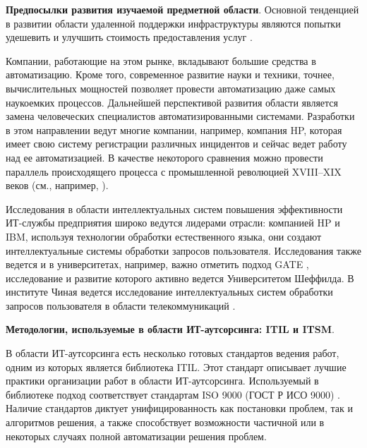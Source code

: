 \textbf{Предпосылки развития изучаемой предметной области}. 
Основной тенденцией в развитии области удаленной поддержки инфраструктуры являются попытки удешевить и улучшить стоимость предоставления услуг \cite{OutsourceEff}. \par
Компании, работающие на этом рынке, вкладывают большие средства в автоматизацию. Кроме того, современное развитие науки и техники, точнее, вычислительных мощностей \cite{SuperComputer} позволяет провести автоматизацию даже самых наукоемких процессов. Дальнейшей перспективой развития области является замена человеческих специалистов автоматизированными системами. Разработки в этом направлении ведут многие компании, например, компания HP, которая имеет свою систему регистрации различных инцидентов и сейчас ведет работу над ее автоматизацией. В качестве некоторого сравнения можно провести параллель происходящего процесса с промышленной революцией XVIII–XIX веков (см., например, \cite{IndustrialRev}). \par
Исследования в области интеллектуальных систем повышения эффективности ИТ-службы предприятия широко ведутся лидерами отрасли: компанией HP и IBM, используя технологии обработки естественного языка, они создают интеллектуальные системы обработки запросов пользователя. Исследования также ведется и в университетах, например, важно отметить подход GATE \cite{GATE-1}, исследование и развитие которого активно ведется Университетом Шеффилда. В институте Чиная ведется исследование интеллектуальных систем обработки запросов пользователя в области телекоммуникаций \cite{CHIN-1}.  \par

\textbf{Методологии, используемые в области ИТ-аутсорсинга: ITIL и ITSM}. \par
В области ИТ-аутсорсинга есть несколько готовых стандартов ведения работ, одним из которых является библиотека ITIL. Этот стандарт описывает лучшие практики организации работ в области ИТ-аутсорсинга. Используемый в библиотеке подход соответствует стандартам ISO 9000 (ГОСТ Р ИСО 9000) \cite{ITIL1, ITIL2, ITIL3}.
Наличие стандартов диктует унифицированность как постановки проблем, так и алгоритмов решения, а также способствует возможности частичной или в некоторых случаях полной автоматизации решения проблем. \par

